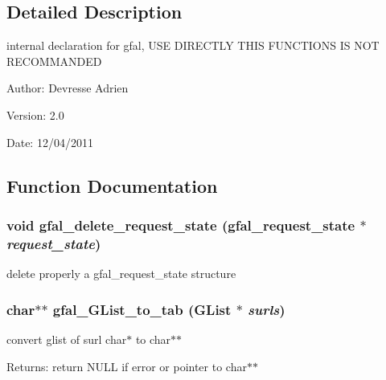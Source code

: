 \subsection{Detailed Description}
internal declaration for gfal, USE DIRECTLY THIS FUNCTIONS IS NOT RECOMMANDED 

\begin{Desc}
\item[Author:]Devresse Adrien \end{Desc}
\begin{Desc}
\item[Version:]2.0 \end{Desc}
\begin{Desc}
\item[Date:]12/04/2011 \end{Desc}


\subsection{Function Documentation}
\subsubsection{\setlength{\rightskip}{0pt plus 5cm}void gfal\_\-delete\_\-request\_\-state (\bf{gfal\_\-request\_\-state} $\ast$ {\em request\_\-state})}\label{gfal__common__internal_8h_9dc1d8d09085708dad268d80688d2a59}


delete properly a gfal\_\-request\_\-state structure 
\subsubsection{\setlength{\rightskip}{0pt plus 5cm}char$\ast$$\ast$ gfal\_\-GList\_\-to\_\-tab (GList $\ast$ {\em surls})}\label{gfal__common__internal_8h_a7e1120eb32c4c7f293f6fbcb4f0ea33}


convert glist of surl char$\ast$ to char$\ast$$\ast$ 

\begin{Desc}
\item[Returns:]return NULL if error or pointer to char$\ast$$\ast$ \end{Desc}
